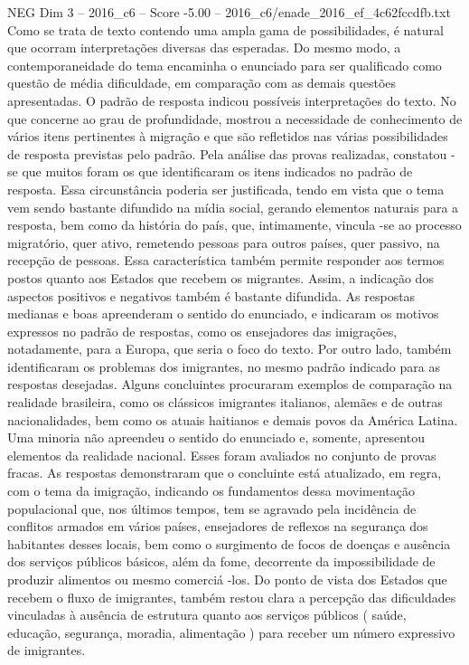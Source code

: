 \begin{textsample}{NEG Dim 3 – 2016\_c6 – Score -5.00 – 2016\_c6/enade\_2016\_ef\_4c62fccdfb.txt}
Como se trata de texto contendo uma ampla gama de possibilidades, é natural que ocorram interpretações diversas das esperadas.
Do mesmo modo, a contemporaneidade do tema encaminha o enunciado para ser qualificado como questão de média dificuldade, em comparação com as demais questões apresentadas.
O padrão de resposta indicou possíveis interpretações do texto.
No que concerne ao grau de profundidade, mostrou a necessidade de conhecimento de vários itens pertinentes à migração e que são refletidos nas várias possibilidades de resposta previstas pelo padrão.
Pela análise das provas realizadas, constatou -se que muitos foram os que identificaram os itens indicados no padrão de resposta.
Essa circunstância poderia ser justificada, tendo em vista que o tema vem sendo bastante difundido na mídia social, gerando elementos naturais para a resposta, bem como da história do país, que, intimamente, vincula -se ao processo migratório, quer ativo, remetendo pessoas para outros países, quer passivo, na recepção de pessoas.
Essa característica também permite responder aos termos postos quanto aos Estados que recebem os migrantes.
Assim, a indicação dos aspectos positivos e negativos também é bastante difundida.
As respostas medianas e boas apreenderam o sentido do enunciado, e indicaram os motivos expressos no padrão de respostas, como os ensejadores das imigrações, notadamente, para a Europa, que seria o foco do texto.
Por outro lado, também identificaram os problemas dos imigrantes, no mesmo padrão indicado para as respostas desejadas.
Alguns concluintes procuraram exemplos de comparação na realidade brasileira, como os clássicos imigrantes italianos, alemães e de outras nacionalidades, bem como os atuais haitianos e demais povos da América Latina.
Uma minoria não apreendeu o sentido do enunciado e, somente, apresentou elementos da realidade nacional.
Esses foram avaliados no conjunto de provas fracas.
As respostas demonstraram que o concluinte está atualizado, em regra, com o tema da imigração, indicando os fundamentos dessa movimentação populacional que, nos últimos tempos, tem se agravado pela incidência de conflitos armados em vários países, ensejadores de reflexos na segurança dos habitantes desses locais, bem como o surgimento de focos de doenças e ausência dos serviços públicos básicos, além da fome, decorrente da impossibilidade de produzir alimentos ou mesmo comerciá -los.
Do ponto de vista dos Estados que recebem o fluxo de imigrantes, também restou clara a percepção das dificuldades vinculadas à ausência de estrutura quanto aos serviços públicos ( saúde, educação, segurança, moradia, alimentação ) para receber um número expressivo de imigrantes.

\end{textsample}
